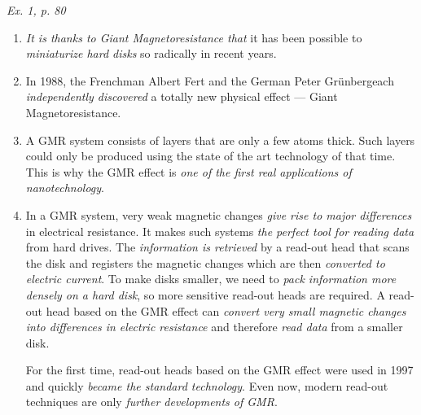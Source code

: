 \documentclass[a4paper, 12pt]{article}
\def\task#1{\begin{center}\it #1\end{center}}
\newif\ifcols
\begin{document}
\fi%

\task{Ex. 1, p. 80}
\ifcols\begin{multicols}{2}\fi%
	\begin{enumerate}[label=\alph*)]
		\item \textit{It is thanks to Giant Magnetoresistance that} it has 
			been possible to \textit{miniaturize hard disks} so radically in 
			recent years.

		\item In 1988, the Frenchman Albert Fert and the German 
			Peter Gr\"{u}nbergeach \textit{independently discovered} 
			a totally new physical effect --- Giant 
			Magnetoresistance.

		\item A GMR system consists of layers that are only a few 
			atoms thick. Such layers could only be produced using 
			the state of the art technology of that time. This is 
			why the GMR effect is \textit{one of the first real 
			applications of nanotechnology}.

		\item In a GMR system, very weak magnetic changes 
			\textit{give rise to major differences} in electrical 
			resistance. It makes such systems \textit{the perfect 
			tool for reading data} from hard drives. The 
			\textit{information is retrieved} by a read-out head 
			that scans the disk and registers the magnetic changes 
			which are then \textit{converted to electric current}. 
			To make disks smaller, we need to \textit{pack information more 
			densely on a hard disk}, so more sensitive read-out heads 
			are required. A read-out head based on the GMR effect 
			can \textit{convert very small magnetic changes into 
			differences in electric resistance} and therefore 
			\textit{read data} from a smaller disk.

			For the first time, read-out heads based on the GMR 
			effect were used in 1997 and quickly \textit{became the 
			standard technology}. Even now, modern read-out 
			techniques are only \textit{further developments of 
			GMR}.
	\end{enumerate}
\ifcols\end{multicols}\fi%
\end{document}
